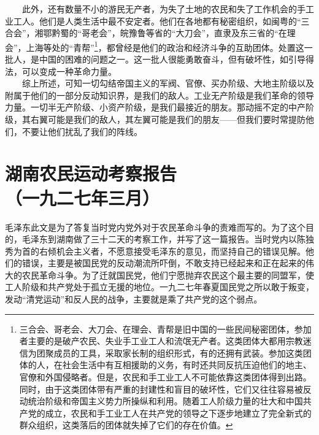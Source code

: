 \documentclass[cn,11pt,chinese]{elegantbook}
\def\myformat#1{\hfil\hfil #1}
\begin{document}
　　此外，还有数量不小的游民无产者，为失了土地的农民和失了工作机会的手工业工人。他们是人类生活中最不安定者。他们在各地都有秘密组织，如闽粤的“三合会”，湘鄂黔蜀的“哥老会”，皖豫鲁等省的“大刀会”，直隶及东三省的“在理会”，上海等处的“青帮”\footnote[17]{ 三合会、哥老会、大刀会、在理会、青帮是旧中国的一些民间秘密团体，参加者主要的是破产农民、失业手工业工人和流氓无产者。这类团体大都用宗教迷信为团聚成员的工具，采取家长制的组织形式，有的还拥有武装。参加这类团体的人，在社会生活中有互相援助的义务，有时还共同反抗压迫他们的地主、官僚和外国侵略者。但是，农民和手工业工人不可能依靠这类团体得到出路。同时，由于这类团体带有严重的封建性和盲目的破坏性，它们又往往容易被反动统治阶级和帝国主义势力所操纵和利用。随着工人阶级力量的壮大和中国共产党的成立，农民和手工业工人在共产党的领导之下逐步地建立了完全新式的群众组织，这类落后的团体就失掉了它们的存在价值。}，都曾经是他们的政治和经济斗争的互助团体。处置这一批人，是中国的困难的问题之一。这一批人很能勇敢奋斗，但有破坏性，如引导得法，可以变成一种革命力量。\\
　　综上所述，可知一切勾结帝国主义的军阀、官僚、买办阶级、大地主阶级以及附属于他们的一部分反动知识界，是我们的敌人。工业无产阶级是我们革命的领导力量。一切半无产阶级、小资产阶级，是我们最接近的朋友。那动摇不定的中产阶级，其右翼可能是我们的敌人，其左翼可能是我们的朋友——但我们要时常提防他们，不要让他们扰乱了我们的阵线。\\
\newpage\section*{\myformat{湖南农民运动考察报告}\\\myformat{（一九二七年三月）}}
\begin{introduction}\item  毛泽东此文是为了答复当时党内党外对于农民革命斗争的责难而写的。为了这个目的，毛泽东到湖南做了三十二天的考察工作，并写了这一篇报告。当时党内以陈独秀为首的右倾机会主义者，不愿意接受毛泽东的意见，而坚持自己的错误见解。他们的错误，主要是被国民党的反动潮流所吓倒，不敢支持已经起来和正在起来的伟大的农民革命斗争。为了迁就国民党，他们宁愿抛弃农民这个最主要的同盟军，使工人阶级和共产党处于孤立无援的地位。一九二七年春夏国民党之所以敢于叛变，发动“清党运动”和反人民的战争，主要就是乘了共产党的这个弱点。　　\end{introduction}
\end{document}
